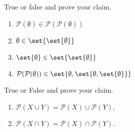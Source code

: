 \documentclass[12pt]{amsart}
\begin{document}
\begin{problem}
True or false and prove your claim.

\begin{enumerate}
	\item $\mathcal{P}(\emptyset) \in \mathcal{P}(\mathcal{P}(\emptyset))$
	      \vspace{5cm}
	\item $\emptyset \in \set{\set{\emptyset}}$
	      \vspace{5cm}
	\item $\set{\emptyset} \in \set{\set{\emptyset}}$
	      \vspace{5cm}
	\item $\mathcal{P}(\mathcal{P}(\emptyset)) \in \set{\emptyset, \set{\emptyset, \set{\emptyset}}}$
	      \vspace{5cm}
\end{enumerate}
\end{problem}

\begin{problem}
True or False and prove your claim.
\begin{enumerate}
	\item $\mathcal{P}(X\cup Y) = \mathcal{P}(X) \cup \mathcal{P}(Y)$,
	      \vspace{5cm}
	\item $\mathcal{P}(X\cap Y) = \mathcal{P}(X) \cap \mathcal{P}(Y)$.
	      \vspace{5cm}
\end{enumerate}
\end{problem}
\end{document}

